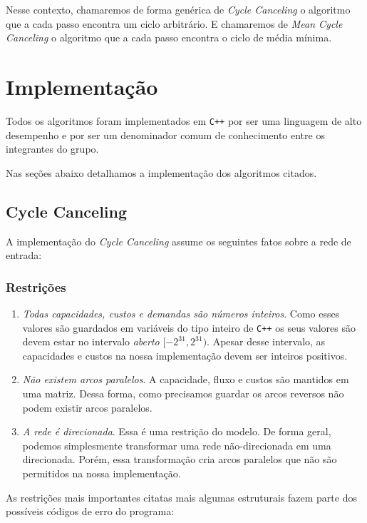 \documentclass[12pt]{article}
\begin{document}
Nesse contexto, chamaremos de forma genérica de \emph{Cycle Canceling} o algoritmo
que a cada passo encontra um ciclo arbitrário. E chamaremos de \emph{Mean Cycle Canceling} 
o algoritmo que a cada passo encontra o ciclo de média mínima.


\section{Implementação}
Todos os algoritmos foram implementados em \texttt{C++} por ser uma linguagem
de alto desempenho e por ser um denominador comum de conhecimento entre os 
integrantes do grupo.

Nas seções abaixo detalhamos a implementação dos algoritmos citados.

\subsection{Cycle Canceling}
A implementação do \emph{Cycle Canceling} assume os seguintes fatos sobre a rede 
de entrada:

\subsubsection{Restrições}

\begin{enumerate}
\item \emph{Todas capacidades, custos e demandas são números inteiros}. Como esses valores
são guardados em variáveis do tipo inteiro de \texttt{C++} os seus valores 
são devem estar no intervalo \emph{aberto} $[-2^{31}, 2^{31})$. Apesar desse intervalo,
as capacidades e custos na nossa implementação devem ser inteiros positivos.

\item \emph{Não existem arcos paralelos}. A capacidade, fluxo e custos são mantidos 
em uma matriz. Dessa forma, como precisamos guardar os arcos reversos não podem 
existir arcos paralelos.  

\item \emph{A rede é direcionada}. Essa é uma restrição do modelo. De forma geral, 
podemos simplesmente transformar uma rede não-direcionada em uma direcionada. Porém,
essa transformação cria arcos paralelos que não são permitidos na nossa implementação.

\end{enumerate}

As restrições mais importantes citatas mais algumas estruturais fazem 
parte dos possíveis códigos de erro do programa: 
\end{document}
